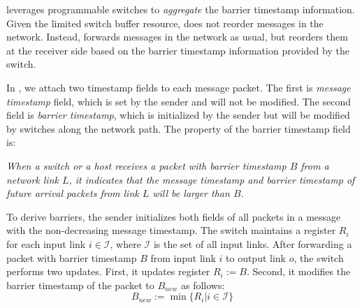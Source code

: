 
 \sys leverages programmable switches to \emph{aggregate} the barrier timestamp information. Given the limited switch buffer resource, \sys does not reorder messages in the network. Instead, \sys forwards messages in the network as usual, but reorders them at the receiver side based on the barrier timestamp information provided by the switch.

In \sys, we attach two timestamp fields to each message packet. The first is \textit{message timestamp} field, which is set by the sender and will not be modified. The second field is \textit{barrier timestamp}, which is initialized by the sender but will be modified by switches along the network path. The property of the barrier timestamp field is:

\emph{When a switch or a host receives a packet with barrier timestamp $B$ from a network link $L$, it indicates that the message timestamp and barrier timestamp of future arrival packets from link $L$ will be larger than $B$.}

To derive barriers, the sender initializes both fields of all packets in a message with the non-decreasing message timestamp. The switch maintains a register $R_i$ for each input link $i \in \mathcal{I}$, where $\mathcal{I}$ is the set of all input links. After forwarding a packet with barrier timestamp $B$ from input link $i$ to output link $o$, the switch performs two updates. First, it updates register $R_i := B$. Second, it modifies the barrier timestamp of the packet to $B_{new}$ as follows:
\begin{equation}\label{equ:derive_barriers}
B_{new}:=\min\{R_i| i\in \mathcal{I}\}
\end{equation}



